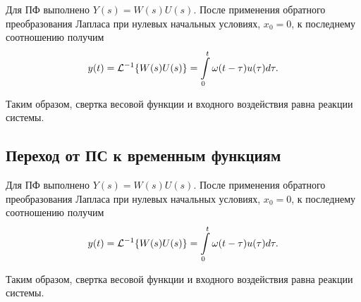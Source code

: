 \documentclass[../../TAU.tex]{subfiles}
\begin{document}
    Для ПФ выполнено 
    $Y(s) = W(s)U(s)$. 
    После применения обратного преобразования Лапласа при нулевых начальных условиях, $x_0=0$, к последнему соотношению получим
    $$
        y(t) = \mathcal{L}^{-1}\{W(s)U(s)\} = \int\limits_{0}^t\omega(t-\tau)u(\tau)d\tau.
    $$

    Таким образом, свертка весовой функции и входного воздействия равна реакции системы.

\subsection{Переход от ПС к временным функциям}

    Для ПФ выполнено 
    $Y(s) = W(s)U(s)$. 
    После применения обратного преобразования Лапласа при нулевых начальных условиях, $x_0=0$, к последнему соотношению получим
    $$
        y(t) = \mathcal{L}^{-1}\{W(s)U(s)\} = \int\limits_{0}^t\omega(t-\tau)u(\tau)d\tau.
    $$

    Таким образом, свертка весовой функции и входного воздействия равна реакции системы.

\end{document}
